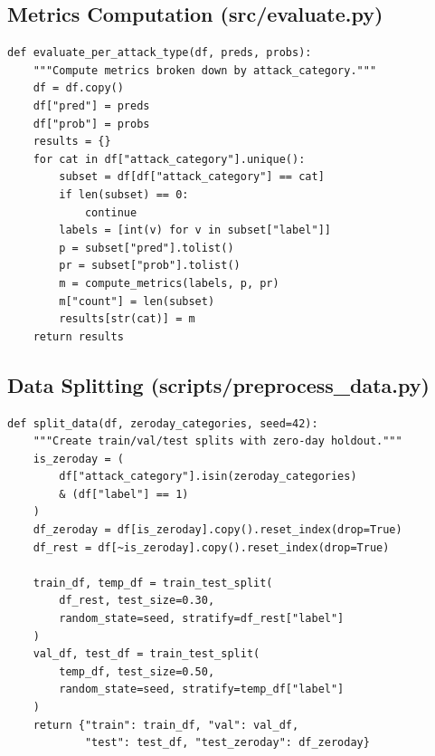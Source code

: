 \documentclass[11pt]{article}
\begin{document}
\subsection{Metrics Computation (src/evaluate.py)}

\begin{lstlisting}[style=python]
def evaluate_per_attack_type(df, preds, probs):
    """Compute metrics broken down by attack_category."""
    df = df.copy()
    df["pred"] = preds
    df["prob"] = probs
    results = {}
    for cat in df["attack_category"].unique():
        subset = df[df["attack_category"] == cat]
        if len(subset) == 0:
            continue
        labels = [int(v) for v in subset["label"]]
        p = subset["pred"].tolist()
        pr = subset["prob"].tolist()
        m = compute_metrics(labels, p, pr)
        m["count"] = len(subset)
        results[str(cat)] = m
    return results
\end{lstlisting}

\subsection{Data Splitting (scripts/preprocess\_data.py)}

\begin{lstlisting}[style=python]
def split_data(df, zeroday_categories, seed=42):
    """Create train/val/test splits with zero-day holdout."""
    is_zeroday = (
        df["attack_category"].isin(zeroday_categories)
        & (df["label"] == 1)
    )
    df_zeroday = df[is_zeroday].copy().reset_index(drop=True)
    df_rest = df[~is_zeroday].copy().reset_index(drop=True)

    train_df, temp_df = train_test_split(
        df_rest, test_size=0.30,
        random_state=seed, stratify=df_rest["label"]
    )
    val_df, test_df = train_test_split(
        temp_df, test_size=0.50,
        random_state=seed, stratify=temp_df["label"]
    )
    return {"train": train_df, "val": val_df,
            "test": test_df, "test_zeroday": df_zeroday}
\end{lstlisting}
\end{document}
